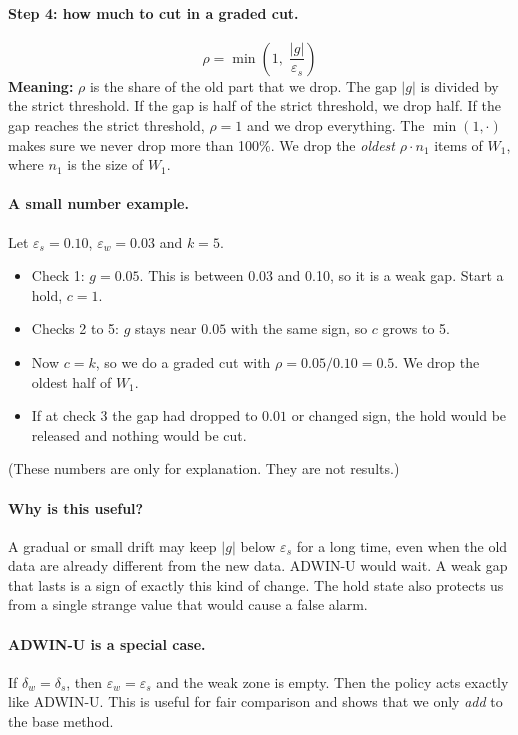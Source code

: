 \documentclass[11pt,a4paper]{article}
\begin{document}
\paragraph{Step 4: how much to cut in a graded cut.}
\[
\rho=\min\!\left(1,\;\frac{|g|}{\varepsilon_s}\right)
\]
\textbf{Meaning:} $\rho$ is the share of the old part that we drop. The gap $|g|$ is divided by the strict threshold. If the gap is half of the strict threshold, we drop half. If the gap reaches the strict threshold, $\rho=1$ and we drop everything. The $\min(1,\cdot)$ makes sure we never drop more than 100\%. We drop the \emph{oldest} $\rho\cdot n_1$ items of $W_1$, where $n_1$ is the size of $W_1$.

\paragraph{A small number example.} Let $\varepsilon_s=0.10$, $\varepsilon_w=0.03$ and $k=5$.
\begin{itemize}
  \item Check 1: $g=0.05$. This is between 0.03 and 0.10, so it is a weak gap. Start a hold, $c=1$.
  \item Checks 2 to 5: $g$ stays near $0.05$ with the same sign, so $c$ grows to 5.
  \item Now $c=k$, so we do a graded cut with $\rho=0.05/0.10=0.5$. We drop the oldest half of $W_1$.
  \item If at check 3 the gap had dropped to $0.01$ or changed sign, the hold would be released and nothing would be cut.
\end{itemize}
(These numbers are only for explanation. They are not results.)

\paragraph{Why is this useful?} A gradual or small drift may keep $|g|$ below $\varepsilon_s$ for a long time, even when the old data are already different from the new data. ADWIN-U would wait. A weak gap that lasts is a sign of exactly this kind of change. The hold state also protects us from a single strange value that would cause a false alarm.

\paragraph{ADWIN-U is a special case.} If $\delta_w=\delta_s$, then $\varepsilon_w=\varepsilon_s$ and the weak zone is empty. Then the policy acts exactly like ADWIN-U. This is useful for fair comparison and shows that we only \emph{add} to the base method.
\end{document}
